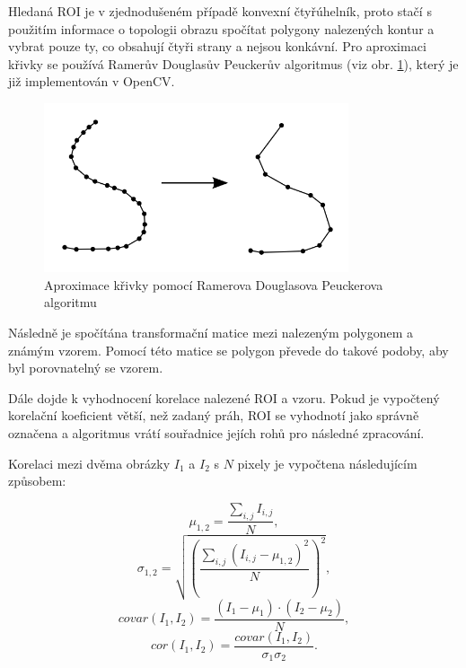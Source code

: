 \documentclass[twoside]{ctuthesis}
\theoremstyle{plain}
\theoremstyle{definition}
\theoremstyle{note}
\begin{document}
Hledaná ROI je v zjednodušeném případě konvexní čtyřúhelník, proto stačí s použitím informace o topologii obrazu spočítat polygony nalezených kontur a vybrat pouze ty, co obsahují čtyři strany a nejsou konkávní. Pro aproximaci křivky se používá Ramerův Douglasův Peuckerův algoritmus \cite{cite:8} (viz obr. \ref{approx}), který je již implementován v OpenCV.
\begin{figure}

	\caption{Aproximace křivky pomocí Ramerova Douglasova Peuckerova algoritmu}

	\label{approx}
	\includegraphics[width=0.8\textwidth]{images/2/approx.png}
\end{figure}


Následně je spočítána transformační matice mezi nalezeným polygonem a známým vzorem. Pomocí této matice se polygon převede do takové podoby, aby byl porovnatelný se vzorem.

Dále dojde k vyhodnocení korelace nalezené ROI a vzoru. Pokud je vypočtený korelační koeficient větší, než zadaný práh, ROI se vyhodnotí jako správně označena a algoritmus vrátí souřadnice jejích rohů pro následné zpracování.

Korelaci mezi dvěma obrázky $I_1$ a $I_2$ s $N$ pixely je vypočtena následujícím způsobem:

	\begin{equation}
	\mu_{1,2} = \frac{\sum_{i,j}I_{i,j}}{N},
	\end{equation}
	\begin{equation}
	\sigma_{1,2} = \sqrt{\left(\frac{\sum_{i,j}(I_{i,j} - \mu_{1,2})^2}{N}\right)^2},
	\end{equation}
	\begin{equation}
	covar(I_1, I_2) = \frac{(I_1 - \mu_1)\cdot(I_2 - \mu_2)}{N},
	\end{equation}
	\begin{equation}
	cor(I_1, I_2) = \frac{covar(I_1, I_2)}{\sigma_1 \sigma_2}.
	\end{equation}
\end{document}
